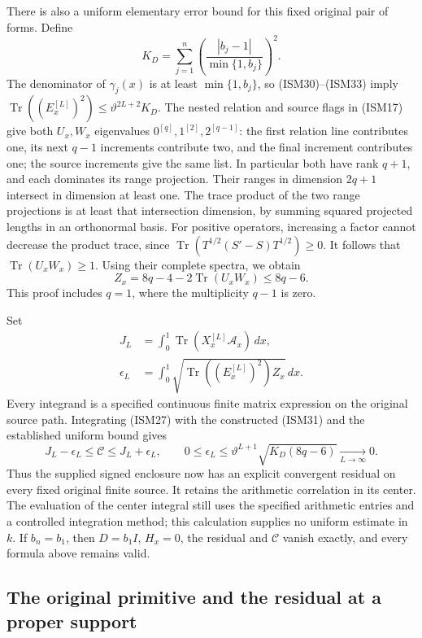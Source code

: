 There is also a uniform elementary error bound for
this fixed original pair of forms.  Define
\[
 K_D=\sum_{j=1}^n
       \left(\frac{|b_j-1|}{\min\{1,b_j\}}\right)^2.
 \tag{ISM34}
\]
The denominator of \(\gamma_j(x)\) is at least
\(\min\{1,b_j\}\), so (ISM30)--(ISM33) imply
\(\operatorname{Tr}((E_x^{[L]})^2)
\leq\vartheta^{2L+2}K_D\).
The nested relation and source flags in (ISM17)
give both \(U_x,W_x\) eigenvalues
\(0^{[q]},1^{[2]},2^{[q-1]}\): the first relation
line contributes one, its next \(q-1\) increments
contribute two, and the final increment contributes
one; the source increments give the same list.
In particular both have rank \(q+1\), and each
dominates its range projection.  Their ranges in
dimension \(2q+1\) intersect in dimension at least one.
The trace product of the two range projections is
at least that intersection dimension, by summing
squared projected lengths in an orthonormal basis.
For positive operators, increasing a factor cannot
decrease the product trace, since
\(\operatorname{Tr}(T^{1/2}(S'-S)T^{1/2})\geq0\).
It follows that \(\operatorname{Tr}(U_xW_x)\geq1\).
Using their complete spectra, we obtain
\[
 Z_x=8q-4-2\operatorname{Tr}(U_xW_x)\leq8q-6.
 \tag{ISM35}
\]
This proof includes \(q=1\), where the multiplicity
\(q-1\) is zero.

Set
\[
 \begin{split}
 J_L&=\int_0^1
          \operatorname{Tr}(X_x^{[L]}\mathcal A_x)\,dx,\\
 \epsilon_L&=\int_0^1
       \sqrt{\operatorname{Tr}((E_x^{[L]})^2)Z_x}\,dx.
 \end{split}
 \tag{ISM36}
\]
Every integrand is a specified continuous finite
matrix expression on the original source path.
Integrating (ISM27) with the constructed (ISM31)
and the established uniform bound gives
\[
 J_L-\epsilon_L\leq\mathcal C\leq J_L+\epsilon_L,
 \qquad
 0\leq\epsilon_L\leq
       \vartheta^{L+1}\sqrt{K_D(8q-6)}
       \xrightarrow[L\to\infty]{}0.
 \tag{ISM37}
\]
Thus the supplied signed enclosure now has an
explicit convergent residual on every fixed
original finite source.  It retains the arithmetic
correlation in its center.  The evaluation of the
center integral still uses the specified arithmetic
entries and a controlled integration method; this
calculation supplies no uniform estimate in \(k\).
If \(b_n=b_1\), then \(D=b_1I\), \(H_x=0\),
the residual and \(\mathcal C\) vanish exactly,
and every formula above remains valid.

\subsection{The original primitive and the residual at a proper support}

